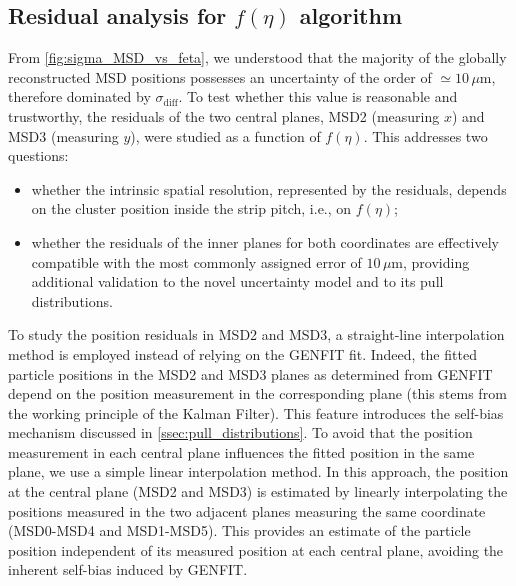 \subsection{Residual analysis for \texorpdfstring{$f(\eta)$}{f(η)} algorithm}\label{ssec:feta_residuals}
From \autoref{fig:sigma_MSD_vs_feta}, we understood that the majority of the globally reconstructed MSD positions possesses an uncertainty of the order of $\simeq10\,\mu\mathrm{m}$, therefore dominated by $\sigma_\text{diff}$. To test whether this value is reasonable and trustworthy, the residuals of the two central planes, MSD2 (measuring $x$) and MSD3 (measuring $y$), were studied as a function of $f(\eta)$. This addresses two questions:
\begin{itemize}
	\item whether the intrinsic spatial resolution, represented by the residuals, depends on the cluster position inside the strip pitch, i.e., on $f(\eta)$;
	\item whether the residuals of the inner planes for both coordinates are effectively compatible with the most commonly assigned error of $10\,\mu\mathrm{m}$, providing additional validation to the novel uncertainty model and to its pull distributions.
\end{itemize}
To study the position residuals in MSD2 and MSD3, a straight-line interpolation method is employed instead of relying on the GENFIT fit. Indeed, the fitted particle positions in the MSD2 and MSD3 planes as determined from GENFIT depend on the position measurement in the corresponding plane (this stems from the working principle of the Kalman Filter). This feature introduces the self-bias mechanism discussed in \autoref{ssec:pull_distributions}. To avoid that the position measurement in each central plane influences the fitted position in the same plane, we use a simple linear interpolation method. In this approach, the position at the central plane (MSD2 and MSD3) is estimated by linearly interpolating the positions measured in the two adjacent planes measuring the same coordinate (MSD0-MSD4 and MSD1-MSD5). This provides an estimate of the particle position independent of its measured position at each central plane, avoiding the inherent self-bias induced by GENFIT.

